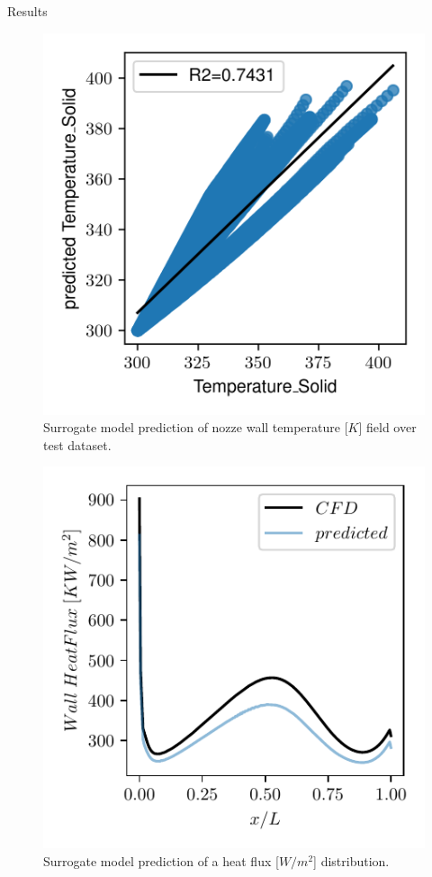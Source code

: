 \begin{frame}{Results}
\begin{figure}
\hypertarget{fig:r2_temperature_solid}{%
\centering
\includegraphics{figures/results/Temperature_Solid.png}
\caption{Surrogate model prediction of nozze wall temperature
{[}\(K\){]} field over test dataset.}\label{fig:r2_temperature_solid}
}
\end{figure}

\begin{figure}
\hypertarget{fig:wall_heat_flux}{%
\centering
\includegraphics{figures/predicted_wall_heat_flux.pdf}
\caption{Surrogate model prediction of a heat flux {[}\(W/m^2\){]}
distribution.}\label{fig:wall_heat_flux}
}
\end{figure}


\end{frame}
